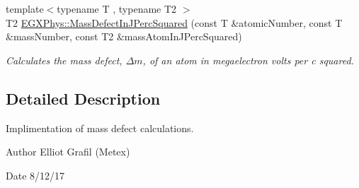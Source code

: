 \begin{DoxyCompactItemize}
{\footnotesize template$<$typename T , typename T2 $>$ }\\T2 \mbox{\hyperlink{group___e_g_x_phys-_mass_defect_ga08cff1dfa3259af8f1b67ec741796e91}{E\+G\+X\+Phys\+::\+Mass\+Defect\+In\+J\+Perc\+Squared}} (const T \&atomic\+Number, const T \&mass\+Number, const T2 \&mass\+Atom\+In\+J\+Perc\+Squared)
\begin{DoxyCompactList}\small\item\em Calculates the mass defect, $\Delta m$, of an atom in megaelectron volts per c squared. \end{DoxyCompactList}\end{DoxyCompactItemize}


\subsection{Detailed Description}
Implimentation of mass defect calculations. 

\begin{DoxyAuthor}{Author}
Elliot Grafil (Metex) 
\end{DoxyAuthor}
\begin{DoxyDate}{Date}
8/12/17 
\end{DoxyDate}
